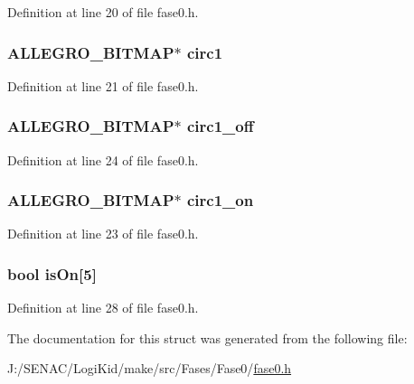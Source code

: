 Definition at line 20 of file fase0.\-h.

\hypertarget{struct_level_zero_a9877f31790b6d2f38fb468a9448223f1}{
\subsubsection[{circ1}]{\setlength{\rightskip}{0pt plus 5cm}A\-L\-L\-E\-G\-R\-O\-\_\-\-B\-I\-T\-M\-A\-P$\ast$ circ1}}\label{struct_level_zero_a9877f31790b6d2f38fb468a9448223f1}


Definition at line 21 of file fase0.\-h.

\hypertarget{struct_level_zero_a61973bafd11ab9dea9306731297f4728}{
\subsubsection[{circ1\-\_\-off}]{\setlength{\rightskip}{0pt plus 5cm}A\-L\-L\-E\-G\-R\-O\-\_\-\-B\-I\-T\-M\-A\-P$\ast$ circ1\-\_\-off}}\label{struct_level_zero_a61973bafd11ab9dea9306731297f4728}


Definition at line 24 of file fase0.\-h.

\hypertarget{struct_level_zero_a15699608afb18fad793848cd8fd32fe0}{
\subsubsection[{circ1\-\_\-on}]{\setlength{\rightskip}{0pt plus 5cm}A\-L\-L\-E\-G\-R\-O\-\_\-\-B\-I\-T\-M\-A\-P$\ast$ circ1\-\_\-on}}\label{struct_level_zero_a15699608afb18fad793848cd8fd32fe0}


Definition at line 23 of file fase0.\-h.

\hypertarget{struct_level_zero_a59f6fe985ed5513f62660b2926c812aa}{
\subsubsection[{is\-On}]{\setlength{\rightskip}{0pt plus 5cm}bool is\-On\mbox{[}5\mbox{]}}}\label{struct_level_zero_a59f6fe985ed5513f62660b2926c812aa}


Definition at line 28 of file fase0.\-h.



The documentation for this struct was generated from the following file\-:\begin{DoxyCompactItemize}
\item 
J\-:/\-S\-E\-N\-A\-C/\-Logi\-Kid/make/src/\-Fases/\-Fase0/\hyperlink{fase0_8h}{fase0.\-h}\end{DoxyCompactItemize}
